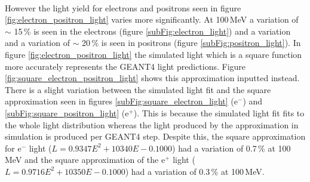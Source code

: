 \\However the light yield for electrons and positrons seen in figure \ref{fig:electron_positron_light} varies more significantly. At 100\,MeV a variation of $\sim$ 15\,\% is seen in the electrons (figure \ref{subFig:electron_light}) and a variation and a variation of $\sim$ 20\,\% is seen in positrons (figure \ref{subFig:positron_light}). In figure \ref{fig:electron_positron_light} the simulated light which is a square function more accurately represents the GEANT4 light predictions. Figure \ref{fig:square_electron_positron_light} shows this approximation inputted instead. There is a slight variation between the simulated light fit and the square approximation seen in figures \ref{subFig:square_electron_light} (e$^-$) and \ref{subFig:square_positron_light} (e$^+$). This is because the simulated light fit fits to the whole light distribution whereas the light produced by the approximation in simulation is produced per GEANT4 step. Despite this, the square approximation for e$^-$ light ($L = 0.9347E^2 + 10340E - 0.1000$) had a variation of 0.7\,\% at 100\,MeV and the square approximation of the e$^+$ light ($L = 0.9716E^2 + 10350E -0.1000$) had a variation of 0.3\,\% at 100\,MeV. 
